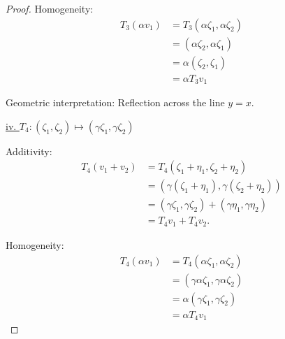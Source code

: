 \documentclass{article}
\begin{document}
\begin{proof}
  Homogeneity:
  \begin{align*}
    T_3 (\alpha v_1)
    &= T_3 (\alpha \zeta_1, \alpha \zeta_2) \\
    &= (\alpha \zeta_2, \alpha \zeta_1) \\
    &= \alpha (\zeta_2, \zeta_1) \\
    &= \alpha T_3 v_1
  \end{align*}

  Geometric interpretation: Reflection across the line $y=x$.
  \newline

  \underline{iv. $T_4: (\zeta_1, \zeta_2) \longmapsto (\gamma \zeta_1, \gamma \zeta_2)$}
  \newline

  Additivity:
  \begin{align*}
    T_4 (v_1 + v_2)
    &= T_4 (\zeta_1 + \eta_1, \zeta_2 + \eta_2) \\
    &= (\gamma (\zeta_1 + \eta_1), \gamma (\zeta_2 + \eta_2)) \\
    &= (\gamma \zeta_1, \gamma \zeta_2) 
    +
    (\gamma \eta_1, \gamma \eta_2)\\
    &= T_4 v_1 + T_4 v_2.
  \end{align*}

  Homogeneity:
  \begin{align*}
    T_4 (\alpha v_1)
    &= T_4 (\alpha \zeta_1, \alpha \zeta_2) \\
    &= (\gamma \alpha \zeta_1, \gamma \alpha \zeta_2) \\
    &= \alpha (\gamma \zeta_1, \gamma \zeta_2) \\
    &= \alpha T_4 v_1
  \end{align*}

\end{proof}
\end{document}
